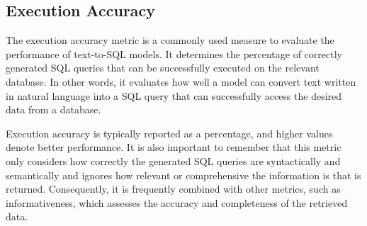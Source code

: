 \subsection{Execution Accuracy}

The execution accuracy metric\cite{yu_spider_2019} is a commonly used measure to evaluate the performance of text-to-SQL models. It determines the percentage of correctly generated SQL queries that can be successfully executed on the relevant database. In other words, it evaluates how well a model can convert text written in natural language into a SQL query that can successfully access the desired data from a database.

Execution accuracy is typically reported as a percentage, and higher values denote better performance. It is also important to remember that this metric only considers how correctly the generated SQL queries are syntactically and semantically and ignores how relevant or comprehensive the information is that is returned. Consequently, it is frequently combined with other metrics, such as informativeness, which assesses the accuracy and completeness of the retrieved data.



